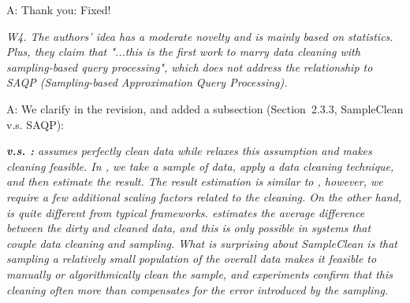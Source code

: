A: Thank you: Fixed!

\mbox{}

\emph{W4. The authors' idea has a moderate novelty and is mainly based on statistics. Plus, they claim that "...this is the first work to marry data cleaning with sampling-based query processing", which does not address the relationship to SAQP (Sampling-based Approximation Query Processing).}


A:    We clarify in the revision, and added a subsection (Section~2.3.3, SampleClean v.s. SAQP):

\noindent \textit{{\noindent \bf \saqpplus v.s. \saqp:} \saqp assumes perfectly clean data while \saqpplus relaxes this assumption and makes cleaning feasible.
In \sampleclean, we take a sample of data, apply a data cleaning technique, and then estimate the result.
The result estimation is similar to \saqp, however, we require a few additional scaling factors related to the cleaning.
On the other hand, \bias is quite different from typical \saqp frameworks.
\bias estimates the average difference between the dirty and cleaned data, and this is only possible in systems that couple data cleaning and sampling. 
What is surprising about SampleClean is
that sampling a relatively small population of the overall data makes
it feasible to manually or algorithmically clean the sample, and
experiments confirm that this cleaning often more than compensates for
the error introduced by the sampling.}




